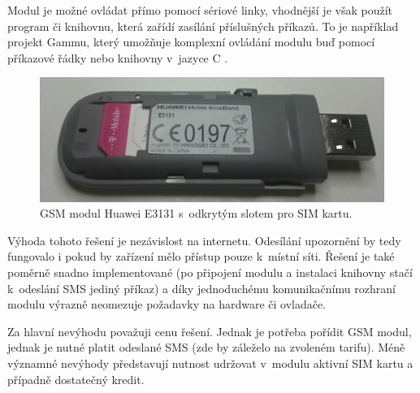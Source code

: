 Modul je možné ovládat přímo pomocí sériové linky, vhodnější je však použít program či knihovnu, která zařídí zasílání příslušných příkazů. To je například projekt Gammu, který umožňuje komplexní ovládání modulu buď pomocí příkazové řádky nebo knihovny v~jazyce C \cite{gammu}.

\begin{figure}[h!]
    \centering
    \includegraphics[width=\textwidth]{images/gsm_module.jpg}
    \caption[GSM modul Huawei E3131]{GSM modul Huawei E3131 s~odkrytým slotem pro SIM kartu.}
    \label{fig:gsm_module}
\end{figure}

Výhoda tohoto řešení je nezávislost na internetu. Odesílání upozornění by tedy fungovalo i pokud by zařízení mělo přístup pouze k~místní síti. Řešení je také poměrně snadno implementované (po připojení modulu a instalaci knihovny stačí k~odeslání SMS jediný příkaz) a díky jednoduchému komunikačnímu rozhraní modulu výrazně neomezuje požadavky na hardware či ovladače.

Za hlavní nevýhodu považuji cenu řešení. Jednak je potřeba pořídit GSM modul, jednak je nutné platit odeslané SMS (zde by záleželo na zvoleném tarifu). Méně významné nevýhody představují nutnost udržovat v~modulu aktivní SIM kartu a případně dostatečný kredit.



